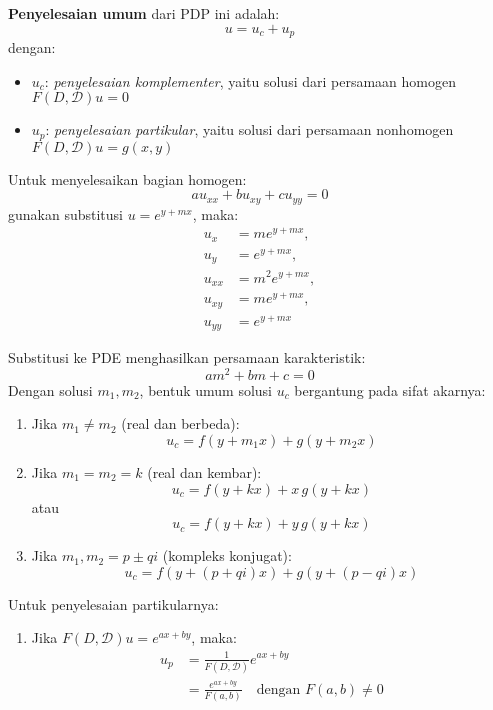 \documentclass[a4paper,extrafontsizes, 9pt]{memoir}
\begin{document}
\begin{multicols}{3}
\textbf{Penyelesaian umum} dari PDP ini adalah:
\[
u = u_c + u_p
\]
dengan:
\begin{itemize}
    \item \( u_c \): \textit{penyelesaian komplementer}, yaitu solusi dari persamaan homogen \( F(D, \mathcal{D}) u = 0 \)
    \item \( u_p \): \textit{penyelesaian partikular}, yaitu solusi dari persamaan nonhomogen \( F(D, \mathcal{D}) u = g(x, y) \)
\end{itemize}

Untuk menyelesaikan bagian homogen:
\[
a u_{xx} + b u_{xy} + c u_{yy} = 0
\]
gunakan substitusi \( u = e^{y + mx} \), maka:
\begin{align*}
    u_x &= m e^{y + mx}, \\
    u_y &= e^{y + mx}, \\
    u_{xx} &= m^2 e^{y + mx}, \\
    u_{xy} &= m e^{y + mx}, \\
    u_{yy} &= e^{y + mx}
\end{align*}

Substitusi ke PDE menghasilkan persamaan karakteristik:
\[
a m^2 + b m + c = 0
\]
Dengan solusi \( m_1, m_2 \), bentuk umum solusi \( u_c \) bergantung pada sifat akarnya:

\begin{enumerate}
    \item Jika \( m_1 \ne m_2 \) (real dan berbeda):
    \[
    u_c = f(y + m_1 x) + g(y + m_2 x)
    \]
    
    \item Jika \( m_1 = m_2 = k \) (real dan kembar):
    \[
    u_c = f(y + kx) + x\,g(y + kx)
    \]
    atau
    \[
    u_c = f(y + kx) + y\,g(y + kx)
    \]
    
    \item Jika \( m_1, m_2 = p \pm qi \) (kompleks konjugat):
    \[
    u_c = f(y + (p + qi)x) + g(y + (p - qi)x)
    \]
\end{enumerate}

Untuk penyelesaian partikularnya:
\begin{enumerate}
    \item Jika \( F(D, \mathcal{D})u = e^{ax + by} \), maka:
    \begin{align*}
        u_p &= \frac{1}{F(D, \mathcal{D})} e^{ax + by} \\
            &= \frac{e^{ax + by}}{F(a,b)} \quad \text{dengan } F(a,b) \ne 0
    \end{align*}
    

\end{enumerate}
\end{multicols}
\end{document}
